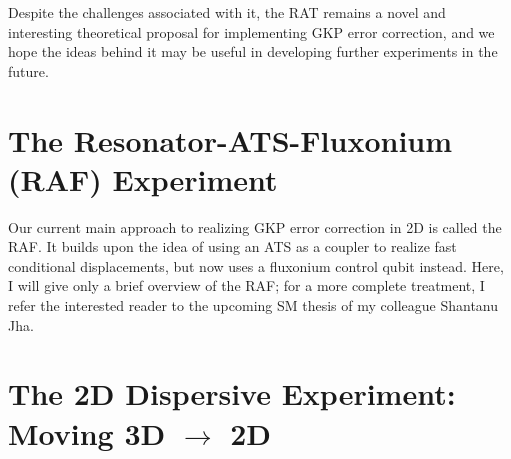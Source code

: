 Despite the challenges associated with it, the RAT remains a novel and interesting theoretical proposal for implementing GKP error correction, and we hope the ideas behind it may be useful in developing further experiments in the future. 
 \clearpage

\section{The Resonator-ATS-Fluxonium (RAF) Experiment \label{sec:5_RAF}}

Our current main approach to realizing GKP error correction in 2D is called the RAF. It builds upon the idea of using an ATS as a coupler to realize fast conditional displacements, but now uses a fluxonium control qubit instead. Here, I will give only a brief overview of the RAF; for a more complete treatment, I refer the interested reader to the upcoming SM thesis of my colleague Shantanu Jha. 





\clearpage


\section{The 2D Dispersive Experiment: Moving 3D \texorpdfstring{$\to$}{to} 2D\label{sec:5_2D_Disp}}

